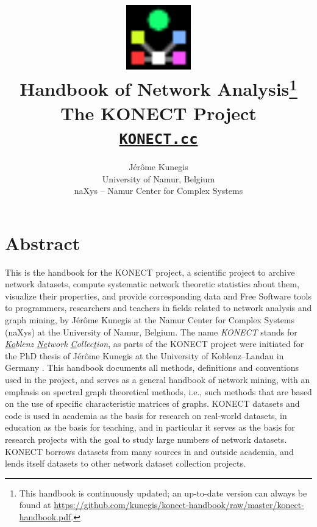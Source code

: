 \documentclass{article}
\begin{document}
\title{
  \includegraphics[width=2.8cm]{konect-logo} \\
  \vspace{0.9cm}
         {\Huge Handbook of Network Analysis\footnote{This handbook is
             continuously updated; an up-to-date version can always be found at
         \href{https://github.com/kunegis/konect-handbook/raw/master/konect-handbook.pdf}{https://github.com/kunegis/konect-handbook/raw/master/konect-handbook.pdf}.}} \\
         The KONECT Project \\
         \texttt{\href{http://KONECT.cc/}{KONECT.cc}}
}

\author{
  Jérôme Kunegis \\
  University of Namur, Belgium \\
  naXys -- Namur Center for Complex Systems 
}

\maketitle

\section*{Abstract}
This is the handbook for the KONECT project, a scientific project to
archive network datasets, compute systematic network theoretic
statistics about them, visualize their properties, and provide
corresponding data and Free Software tools to programmers, researchers and teachers in 
fields related to network analysis and graph mining, by
Jérôme Kunegis at the Namur Center for Complex Systems (naXys) at the
University of Namur, Belgium.  The name \emph{KONECT} stands for
\emph{\underline{Ko}blenz \underline{Ne}twork \underline{C}ollec\underline{t}ion}, as parts of the KONECT project
were initiated for the PhD thesis of Jérôme Kunegis at
the University of Koblenz--Landau in Germany \citeyearpar{kunegis:phd}.  
This handbook
documents all methods, definitions and conventions used in the project,
and serves as a general handbook of network mining, with an emphasis on
spectral graph theoretical methods, i.e., such methods that are based on
the use of specific characteristic matrices of graphs. 
KONECT datasets and code is used in academia as the basis for research
on real-world datasets, in education as the basis for teaching, and
in particular it serves as the basis for research projects with the goal
to study large numbers of network datasets.  KONECT borrows 
datasets from many sources in and outside academia, and lends itself
datasets to other network dataset collection projects. 
\thispagestyle{empty}
\restoregeometry
\newpage
\end{document}
